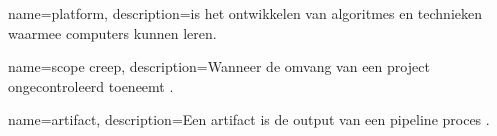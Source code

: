 {
    name=platform,
    description={is het ontwikkelen van algoritmes en technieken waarmee computers kunnen leren.}
}

{
    name=scope creep,
    description={Wanneer de omvang van een project ongecontroleerd toeneemt \cite{scope-creep-definition}.}
}

{
    name=artifact,
    description={Een artifact is de output van een pipeline proces \cite{artifact-definition}.}
}